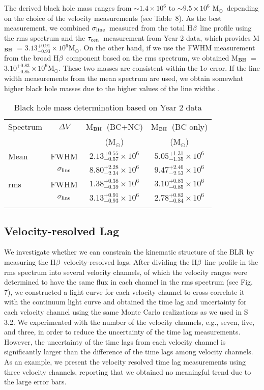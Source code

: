\documentclass[iop]{emulateapj}
\newcommand{\Hb}{\rm H{$\beta$}}
\newcommand{\mbh}{M$_{\rm BH}$}
\newcommand{\msun}{M$_{\odot}$}
\newcommand{\lagcen}{$\tau_{\rm cen}$}
\newcommand{\sigmaline}{$\sigma_{\rm line}$}
\begin{document}
The derived black hole mass ranges from $\sim 1.4 \times 10^{6}$ to $\sim 9.5 \times 10^{6}$ \msun\ depending on the choice of the velocity measurements (see Table~8). As the best measurement, we combined \sigmaline\ measured from the total \Hb\ line profile using the rms spectrum and the \lagcen\ measurement from Year 2 data, which provides \mbh\ = $3.13^{+0.91}_{-0.93} \times 10^{6}$\msun. On the other hand, if we use the FWHM measurement from the broad \Hb\ component based on the rms spectrum, we obtained \mbh\ =  $3.10^{+0.83}_{-0.85} \times 10^{6}$\msun. These two masses are consistent within the 1$\sigma$ error. If the line width measurements from the mean spectrum are used, we obtain somewhat higher black hole masses due to the higher values of the line widths \citep[see also][]{Sergeev+99, Shapovalova+04, Collin+06, Park+12}.


\begin{table}
	\centering
	\caption{Black hole mass determination based on Year 2 data}
	\begin{tabular}{lccc}
		\tableline\tableline
		Spectrum  & $\Delta V$ & \mbh\ (BC+NC)  & \mbh\ (BC only)  \\
		& & (\msun) & (\msun) \\
		\tableline
		Mean & FWHM &  $2.13^{+0.55}_{-0.57} \times 10^{6}$ & $5.05^{+1.31}_{-1.35} \times 10^{6}$  \\
              & \sigmaline & $8.80^{+2.28}_{-2.34} \times 10^{6}$ & $9.47^{+2.46}_{-2.53} \times 10^{6}$ \\
           rms & FWHM & $1.38^{+0.38}_{-0.39} \times 10^{6}$ & {\bf $3.10^{+0.83}_{-0.85} \times 10^{6}$  } \\
              & \sigmaline & {\bf $3.13^{+0.91}_{-0.93} \times 10^{6}$ } &  $2.78^{+0.82}_{-0.84} \times 10^{6}$  \\
		\tableline
	\end{tabular}
	\label{table8}
\end{table}

\subsection{Velocity-resolved Lag}
We investigate whether we can constrain the kinematic structure of the BLR by measuring the \Hb\ velocity-resolved lags. 
After dividing the \Hb\ line profile in the rms spectrum into several velocity channels, of which the velocity ranges were determined to have the same flux in each channel in the rms spectrum (see Fig. 7), 
we constructed a light curve for each velocity channel to cross-correlate it with the continuum light curve and obtained 
the time lag and uncertainty for each velocity channel using the same Monte Carlo realizations as we used in S 3.2.
We experimented with the number of the velocity channels, e.g., seven, five, and three, in order to reduce the uncertainty of the time lag measurements.
However, the uncertainty of the time lags from each velocity channel is significantly larger than the difference of the time lags among velocity channels.
As an example, we present the velocity resolved time lag measurements using three velocity channels, reporting that we obtained
no meaningful trend due to the large error bars. 
\end{document}
